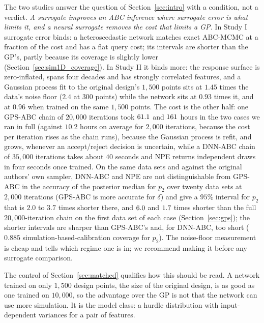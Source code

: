 \documentclass[sn-basic,iicol,pdflatex]{sn-jnl}
\begin{document}
The two studies answer the question of Section~\ref{sec:intro} with a condition,
not a verdict. \emph{A surrogate improves an ABC inference where surrogate error
is what limits it, and a neural surrogate removes the cost that limits a GP.}
In Study I surrogate error binds: a heteroscedastic network matches exact ABC-MCMC at a fraction of the cost and has a flat query cost; its intervals are shorter than the GP's, partly because its coverage is slightly lower (Section~\ref{sec:sim1D_coverage}). In Study II it binds more: the response
surface is zero-inflated, spans four decades and has strongly correlated features, and a
Gaussian process fit to the original design's $1{,}500$ points sits at $1.45$ times the data's noise
floor ($2.4$ at $300$ points) while the network sits at $0.93$ times it, and at $0.96$ when trained on the same $1{,}500$ points. The cost is the other half: one
GPS-ABC chain of $20{,}000$ iterations took $61.1$ and $161$ hours in the two cases we ran in full (against $10.2$ hours on average for $2{,}000$ iterations, because the cost per iteration rises as the chain runs), because the Gaussian process is refit, and grows,
whenever an accept/reject decision is uncertain, while a DNN-ABC chain of $35{,}000$ iterations takes about $40$ seconds
and NPE returns independent draws in four seconds once trained. On the same data sets and against the original authors' own sampler, DNN-ABC and NPE are not distinguishable from GPS-ABC in the accuracy of the posterior median for $p_2$ over twenty data sets at $2{,}000$ iterations (GPS-ABC is more accurate for $\delta$) and give a $95\%$ interval for $p_2$ that is $2.0$ to $3.7$ times shorter there, and $6.0$ and $1.7$ times shorter than the full $20{,}000$-iteration chain on the first data set of each case (Section~\ref{sec:gps}); the shorter intervals are sharper than GPS-ABC's and, for DNN-ABC, too short ($0.885$ simulation-based-calibration coverage for $p_2$).
The noise-floor measurement is cheap and tells which regime one is in; we recommend making it before any
surrogate comparison.

The control of Section~\ref{sec:matched} qualifies how this should be read. A network
trained on only $1{,}500$ design points, the size of the original design, is as good as one
trained on $10{,}000$, so the advantage over the GP is not that the network can use more simulation.
It is the model class: a hurdle distribution with input-dependent variances for a pair of features.
\end{document}
